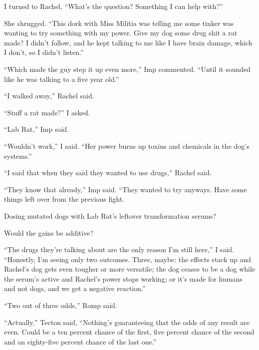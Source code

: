 I turned to Rachel, ``What's the question?  Something I can help with?''



She shrugged.  ``This dork with Miss Militia was telling me some tinker was wanting to try something with my power.  Give my dog some drug shit a rat made?  I didn't follow, and he kept talking to me like I have brain damage, which I don't, so I didn't listen.''



``Which made the guy step it up even more,'' Imp commented.  ``Until it sounded like he was talking to a five year old.''



``I walked away,'' Rachel said.



``Stuff a rat made?'' I asked.



``Lab Rat,'' Imp said.



``Wouldn't work,'' I said.  ``Her power burns up toxins and chemicals in the dog's systems.''



``I said that when they said they wanted to use drugs,'' Rachel said.



``They know that already,'' Imp said.  ``They wanted to try anyways.  Have some things left over from the previous fight.



Dosing mutated dogs with Lab Rat's leftover transformation serums?



Would the gains be additive?



``The drugs they're talking about are the only reason I'm still here,'' I said.  ``Honestly, I'm seeing only two outcomes.  Three, maybe: the effects stack up and Rachel's dog gets even tougher or more versatile; the dog ceases to be a dog while the serum's active and Rachel's power stops working; or it's made for humans and not dogs, and we get a negative reaction.''



``Two out of three odds,'' Romp said.



``Actually,'' Tecton said, ``Nothing's guaranteeing that the odds of any result are even.  Could be a ten percent chance of the first, five percent chance of the second and an eighty-five percent chance of the last one.''



